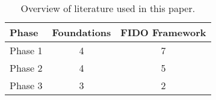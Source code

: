 \begin{table}[ht]
    \centering
    \caption{Overview of literature used in this paper.}
    \label{tab:literature_review}
    \begin{tabular}{ l | c | c }
        \textbf{Phase} & \textbf{Foundations} & \textbf{FIDO Framework}\\
        \hline
        Phase 1 & 4 & 7\\
        Phase 2 & 4 & 5\\
        Phase 3 & 3 & 2\\
    \end{tabular}
\end{table}